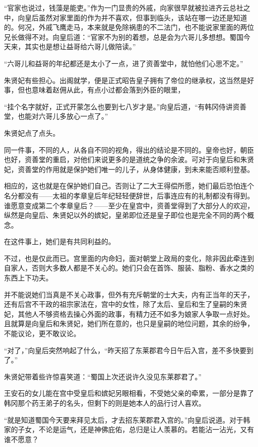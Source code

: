“官家也说过，钱藻是能吏。”作为一门显贵的外戚，向家很早就被拉进齐云总社之中，向皇后虽然对家里面的作为并不喜欢，但事到临头，该站在哪一边还是知道的。何况，外戚飞鹰走马，本来就是免除祸患的不二法门，也不能说家里面的两位兄长做得不对。向皇后道：“官家不为别的着想，总是会为六哥儿多想想。蜀国今天来，其实也是想让益哥给六哥儿做陪读。”

“六哥儿和益哥的年纪都还是太小了一点，进了资善堂中，就怕他们心思不定。”

朱贤妃有些担心。出阁就学，便是正式昭告皇子拥有了帝位的继承权，这当然是好事，但也意味着赵佣从此，有点小过都会落到外臣的眼里，

“挂个名字就好，正式开蒙怎么也要到七八岁才是。”向皇后道，“有韩冈侍讲资善堂，也能对六哥儿多放心一点了。”

朱贤妃点了点头。

同一件事，不同的人，从各自不同的视角，得出的结论是不同的。皇帝也好，朝臣也好，资善堂的重启，对他们来说更多的是道统之争的余波。可对于向皇后和朱贤妃，资善堂的作用就是保护她们唯一的儿子，从身体健康，到未来能否顺利登基。

相应的，这也就是在保护她们自己。否则让了二大王得偿所愿，她们最后恐怕连个名分都没有——太祖的孝章皇后年纪轻轻便辞世，后事连应有的礼制都没有得到。谁愿意变成第二个孝章皇后？——至少在皇宫中，资善堂得到了大部分人的欢迎，纵然是向皇后、朱贤妃以外的嫔妃，皇弟即位还是皇子即位也是完全不同的两个概念。

在这件事上，她们是有共同利益的。

不过，也是仅此而已。宫里面的内命妇，面对朝堂上政局的变化，除非因此牵连到自家人，否则大多数人都是不关心的。她们只会在首饰、服装、脂粉、香水之类的东西上下功夫。

并不能说她们当真是不关心政事，但外有充斥朝堂的士大夫，内有正当年的天子，还有后宫不干政的祖宗家法在，宫中的女性，除了太后、皇后和生了皇嗣的朱贤妃，其他人不够资格去操心外面的政事，有精力还不如多为娘家人争取一点好处。且就算是向皇后和朱贤妃，她们所在意的，也只是皇嗣的地位问题，其余的纷争，不能议论，更不敢议论。

“对了，”向皇后突然响起了什么，“昨天招了东莱郡君今日午后入宫，差不多快要到了。”

朱贤妃带着些许惊喜笑道：“蜀国上次还说许久没见东莱郡君了。”

王安石的女儿能在宫中受皇后和嫔妃另眼相看，不受她父亲的牵累，一部分是靠了韩冈那个药王弟子的名头，但剩下的则是她本人的品行讨人喜欢。

“就是知道蜀国今天要来拜见太后，才去招东莱郡君入宫的。”向皇后说道。对于韩家的子女，不论是运气，还是神佛庇佑，总归是让人羡慕的。若能沾一沾光，又有谁不愿意？

